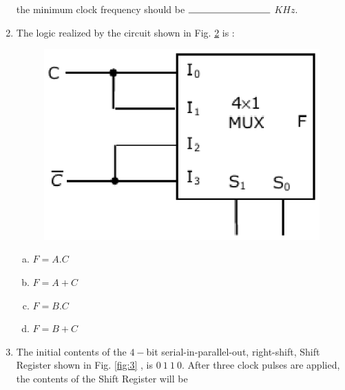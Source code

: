 \documentclass[journal,12pt,twocolumn]{IEEEtran}
\begin{document}
\begin{enumerate}
\begin{figure}
\caption{}

\label{fig:1}

\end{figure} 




 the minimum clock frequency should be $ \rule{3cm}{0.15mm}$ $KHz$.
 
 
\item The logic realized by the circuit shown in Fig. \ref{fig:2} is :



\begin{figure}

\centering

\includegraphics[width=\columnwidth]{./figs/2.eps}

\caption{}

\label{fig:2}

\end{figure} 



\begin{enumerate}[(a)]
 
\item $
F = A.C
$

\item $
F = A + C
$

\item $
F = B.C
$

\item $
F = B + C
$


\end{enumerate}


\item The initial contents of the $4 -$bit serial-in-parallel-out, right-shift, Shift Register shown in Fig. \ref{fig:3} , is $ 0 \ 1 \ 1 \ 0 $. After three clock pulses are applied, the contents of the Shift Register will be


\end{enumerate}
\end{document}
